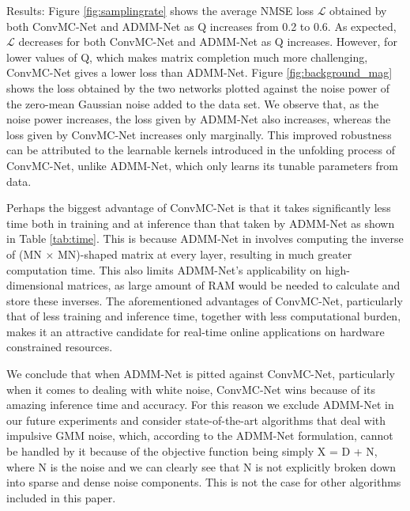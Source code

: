 {Results:} Figure \ref{fig:samplingrate} shows the average NMSE loss \(\mathcal{L}\) obtained by both ConvMC-Net and ADMM-Net as Q increases from 0.2 to 0.6. As expected, \(\mathcal{L}\) decreases for both ConvMC-Net and ADMM-Net as Q increases. However, for lower values of Q, which makes matrix completion much more challenging, ConvMC-Net gives a lower loss than ADMM-Net. Figure \ref{fig:background_mag} shows the loss obtained by the two networks plotted against the noise power of the zero-mean Gaussian noise added to the data set. We observe that, as the noise power increases, the loss given by ADMM-Net also increases, whereas the loss given by ConvMC-Net increases only marginally. This improved robustness can be attributed to the learnable kernels introduced in the unfolding process of ConvMC-Net, unlike ADMM-Net, which only learns its tunable parameters from data.

Perhaps the biggest advantage of ConvMC-Net is that it takes significantly less time both in training and at inference than that taken by ADMM-Net as shown in Table \ref{tab:time}. This is because ADMM-Net in involves computing the inverse of (MN \(\times\) MN)-shaped matrix at every layer, resulting in much greater computation time. This also limits ADMM-Net's applicability on high-dimensional matrices, as large amount of RAM would be needed to calculate and store these inverses. The aforementioned advantages of ConvMC-Net, particularly that of less training and inference time, together with less computational burden, makes it an attractive candidate for real-time online applications on hardware constrained resources.

We conclude that when ADMM-Net is pitted against ConvMC-Net, particularly when it comes to dealing with white noise, ConvMC-Net wins because of its amazing inference time and accuracy. For this reason we exclude ADMM-Net in our future experiments and consider state-of-the-art algorithms that deal with impulsive GMM noise, which, according to the ADMM-Net formulation, cannot be handled by it because of the objective function being simply X = D + N, where N is the noise and we can clearly see that N is not explicitly broken down into sparse and dense noise components. This is not the case for other algorithms included in this paper.


